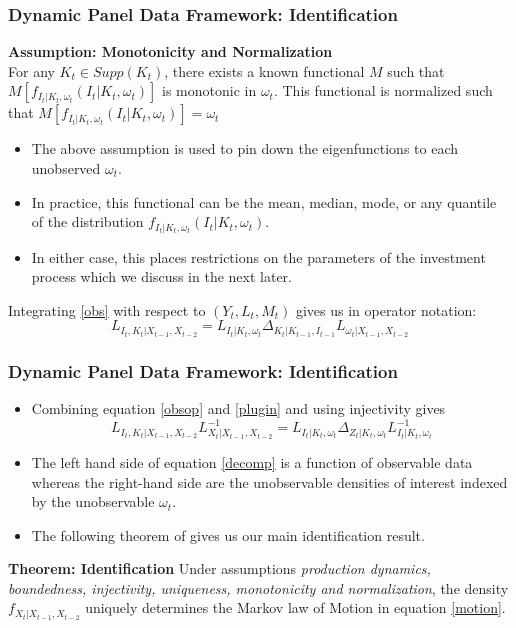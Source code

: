 \documentclass{beamer}
\begin{document}
\begin{frame}
\frametitle{Dynamic Panel Data Framework: Identification}
\textbf{Assumption: Monotonicity and Normalization}\\
For any $K_{t}\in Supp(K_{t})$, there exists a known functional $M$ such that $M[f_{I_{t}|K_{t}, \omega_{t}}(I_{t}|K_{t}, \omega_{t})]$ is monotonic in $\omega_{t}$. This functional is normalized such that $M[f_{I_{t}|K_{t}, \omega_{t}}(I_{t}|K_{t}, \omega_{t})]=\omega_{t}$
\begin{itemize}
\item The above assumption is used to pin down the eigenfunctions to each unobserved $\omega_{t}$. 
\item In practice, this functional can be the mean, median, mode, or any quantile of the distribution $f_{I_{t}|K_{t}, \omega_{t}}(I_{t}|K_{t}, \omega_{t})$. 
\item In either case, this places restrictions on the parameters of the investment process which we discuss in the next later.
\end{itemize}
Integrating \eqref{obs} with respect to $(Y_{t}, L_{t}, M_{t})$ gives us in operator notation:
\begin{equation} \label{plugin}
L_{I_{t}, K_{t}|X_{t-1}, X_{t-2}}=L_{I_{t}|K_{t}, \omega_{t}}\Delta_{K_{t}|K_{t-1}, I_{t-1}}L_{\omega_{t}|X_{t-1}, X_{t-2}}
\end{equation}
\end{frame}


\begin{frame}
\frametitle{Dynamic Panel Data Framework: Identification}
\begin{itemize}
\item Combining equation \eqref{obsop} and \eqref{plugin} and using injectivity gives
\begin{equation} \label{decomp}
L_{I_{t}, K_{t}|X_{t-1}, X_{t-2}}L^{-1}_{X_{t}|X_{t-1}, X_{t-2}}=L_{I_{t}|K_{t}, \omega_{t}}\Delta_{Z_{t}|K_{t}, \omega_{t}}L^{-1}_{I_{t}|K_{t}, \omega_{t}}
\end{equation}
\item The left hand side of equation \eqref{decomp} is a function of observable data whereas the right-hand side are the unobservable densities of interest indexed by the unobservable $\omega_{t}$. 
\item The following theorem of \cite{Hu2008} gives us our main identification result.\\
\end{itemize}
\textbf{Theorem: Identification}
Under assumptions \textit{production dynamics, boundedness, injectivity, uniqueness, monotonicity and normalization}, the density $f_{X_{t}|X_{t-1}, X_{t-2}}$ uniquely determines the Markov law of Motion in equation \eqref{motion}.
\end{frame}
\end{document}
